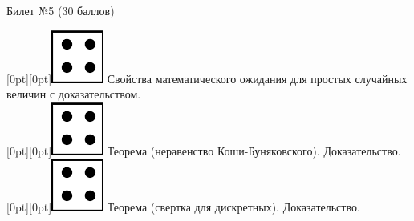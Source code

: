 \documentclass[10pt]{article}
\begin{document}
\thispagestyle{empty}

\topskip=0pt

\vspace*{\fill}

\begin{center} {\Large Билет №5 (30 баллов)} \end{center}

\raisebox{-1pt}[0pt][0pt]{\includegraphics[width=0.02\linewidth]{4.png}} Свойства математического ожидания для  простых случайных величин с доказательством. \\

\raisebox{-1pt}[0pt][0pt]{\includegraphics[width=0.02\linewidth]{4.png}} Теорема (неравенство Коши-Буняковского). Доказательство. \\

\raisebox{-1pt}[0pt][0pt]{\includegraphics[width=0.02\linewidth]{4.png}} Теорема (свертка для дискретных). Доказательство. \\









\vspace*{\fill}
\end{document}
